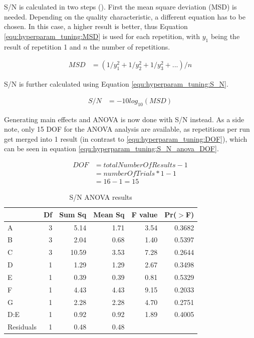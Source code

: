 S/N is calculated in two steps (\cite{roy_primer_1990}). First the mean square deviation (MSD) is needed. Depending on the quality characteristic, a different equation has to be chosen. In this case, a higher result is better, thus Equation \ref{equ:hyperparam_tuning:MSD} is used for each repetition, with $y_1$ being the result of repetition 1 and $n$ the number of repetitions.

\begin{equation}
	\begin{split}
		MSD & = (1/y^2_1 + 1/y^2_2 + 1/y^2_3 + ... ) / n
	\end{split}
	 \label{equ:hyperparam_tuning:MSD}
\end{equation}

S/N is further calculated using Equation \ref{equ:hyperparam_tuning:S_N}.

\begin{equation}
	\begin{split}
		S/N & = -10 log_{10} (MSD)
	\end{split}
	 \label{equ:hyperparam_tuning:S_N}
\end{equation}

Generating main effects and ANOVA is now done with S/N instead. As a side note, only 15 DOF for the ANOVA analysis are available, as repetitions per run get merged into 1 result (in contrast to \ref{equ:hyperparam_tuning:DOF}), which can be seen in equation \ref{equ:hyperparam_tuning:S_N_anova_DOF}.

\begin{equation}
	\begin{split}
		DOF & = totalNumberOfResults - 1 \\
		& = numberOfTrials * 1 - 1 \\
		& = 16 - 1 = 15
	\end{split}
	 \label{equ:hyperparam_tuning:S_N_anova_DOF}
\end{equation}

\begin{table}[ht]
	\centering
	\begin{tabular}{lrrrrr}
		\hline
		& Df & Sum Sq & Mean Sq & F value & Pr($>$F) \\ 
		\hline
		A & 3 & 5.14 & 1.71 & 3.54 & 0.3682 \\ 
		B & 3 & 2.04 & 0.68 & 1.40 & 0.5397 \\ 
		C & 3 & 10.59 & 3.53 & 7.28 & 0.2644 \\ 
		D & 1 & 1.29 & 1.29 & 2.67 & 0.3498 \\ 
		E & 1 & 0.39 & 0.39 & 0.81 & 0.5329 \\ 
		F & 1 & 4.43 & 4.43 & 9.15 & 0.2033 \\ 
		G & 1 & 2.28 & 2.28 & 4.70 & 0.2751 \\ 
		D:E & 1 & 0.92 & 0.92 & 1.89 & 0.4005 \\ 
		Residuals & 1 & 0.48 & 0.48 &  &  \\ 
		\hline
	\end{tabular}
	\caption{S/N ANOVA results}
	\label{tab:hyperparameter_tuning:s_n_anova_results}
\end{table}

